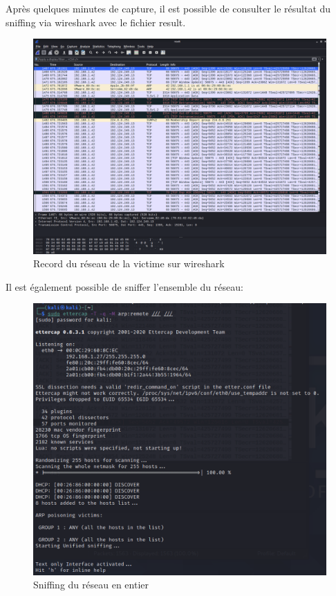 \documentclass[12pt, oneside]{article}
\begin{document}
Après quelques minutes de capture, il est possible de consulter le résultat du sniffing via wireshark avec le fichier result.
\begin{figure}[H]
\centering
\includegraphics[scale=0.28]{wir2}
\caption{Record du réseau de la victime sur wireshark}
\end{figure}
Il est également possible de sniffer l'ensemble du réseau:
\begin{figure}[H]
\centering
\includegraphics[scale=0.35]{full-net}
\caption{Sniffing du réseau en entier}
\end{figure}
\end{document}
